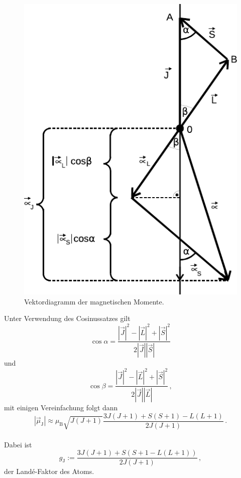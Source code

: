 \begin{figure}[H]
    \centering
    \includegraphics{figures/Abb_1.pdf}
    \caption{Vektordiagramm der magnetischen Momente\cite{ap07}.}
    \label{fig:abb1}
\end{figure} 

Unter Verwendung des Cosinussatzes gilt
\begin{equation*}
    \cos\alpha = \dfrac{|\vec{J}|^2 - |\vec{L}|^2 + |\vec{S}|^2}{2|\vec{J}| |\vec{S}|}
\end{equation*}
und
\begin{equation*}
    \cos\beta = \dfrac{|\vec{J}|^2 - |\vec{L}|^2 + |\vec{S}|^2}{2|\vec{J}| |\vec{L}|} \,,
\end{equation*}
mit einigen Vereinfachung folgt dann
\begin{equation}
    |\vec{\mu}_\text{J}| \approx \mu_\text{B} \sqrt{J(J + 1)} \dfrac{3 J (J + 1) + {S(S + 1) - L(L +1)}}{2J(J + 1)} \,.
\end{equation} \\

Dabei ist 
\begin{equation}
    g_\text{J} := \dfrac{3 J(J + 1) + {S(S + 1 - L(L + 1))}}{2 J(J + 1)} \,,
    \label{eq:lande-faktor}
\end{equation}
der Landé-Faktor des Atoms. \\

